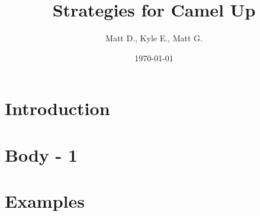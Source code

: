 \documentclass{article}
\title{Strategies for Camel Up}
\author{Matt D., Kyle E., Matt G.}
\date{\today}
\begin{document}
\maketitle
\section{Introduction}

\section{Body - 1}

\section{Examples}
\end{document}
